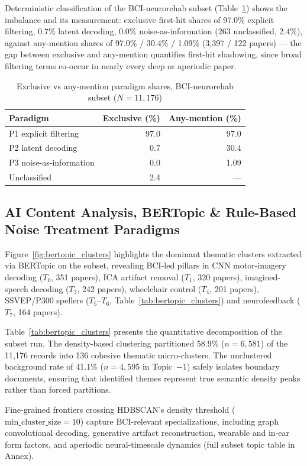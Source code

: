 \documentclass[preprint,12pt]{elsarticle}
\begin{document}
Deterministic classification of the BCI-neurorehab subset (Table~\ref{tab:paradigm_sensitivity}) shows the imbalance and its measurement: exclusive first-hit shares of 97.0\% explicit filtering, 0.7\% latent decoding, 0.0\% noise-as-information (263 unclassified, 2.4\%), against any-mention shares of 97.0\% / 30.4\% / 1.09\% (3,397 / 122 papers) --- the gap between exclusive and any-mention quantifies first-hit shadowing, since broad filtering terms co-occur in nearly every deep or aperiodic paper.
\begin{table}[htbp]
\caption{Exclusive vs any-mention paradigm shares, BCI-neurorehab subset ($N=11{,}176$)}
\label{tab:paradigm_sensitivity}
\centering
\begin{tabular}{lrr}
\toprule
Paradigm & Exclusive (\%) & Any-mention (\%) \\
\midrule
P1 explicit filtering & 97.0 & 97.0 \\
P2 latent decoding & 0.7 & 30.4 \\
P3 noise-as-information & 0.0 & 1.09 \\
Unclassified & 2.4 & --- \\
\bottomrule
\end{tabular}
\end{table}

\subsection{AI Content Analysis, BERTopic \& Rule-Based Noise Treatment Paradigms}
Figure~\ref{fig:bertopic_clusters} highlights the dominant thematic clusters extracted via BERTopic on the subset, revealing BCI-led pillars in CNN motor-imagery decoding ($T_0$, 351 papers), ICA artifact removal ($T_1$, 320 papers), imagined-speech decoding ($T_3$, 242 papers), wheelchair control ($T_4$, 201 papers), SSVEP/P300 spellers ($T_5$--$T_6$, Table~\ref{tab:bertopic_clusters}) and neurofeedback ($T_7$, 164 papers).

Table~\ref{tab:bertopic_clusters} presents the quantitative decomposition of the subset run. The density-based clustering partitioned 58.9\% ($n=6{,}581$) of the 11,176 records into 136 cohesive thematic micro-clusters. The unclustered background rate of 41.1\% ($n=4{,}595$ in Topic~$-1$) safely isolates boundary documents, ensuring that identified themes represent true semantic density peaks rather than forced partitions.

Fine-grained frontiers crossing HDBSCAN's density threshold ($\text{min\_cluster\_size}=10$) capture BCI-relevant specializations, including graph convolutional decoding, generative artifact reconstruction, wearable and in-ear form factors, and aperiodic neural-timescale dynamics (full subset topic table in Annex).
\end{document}
